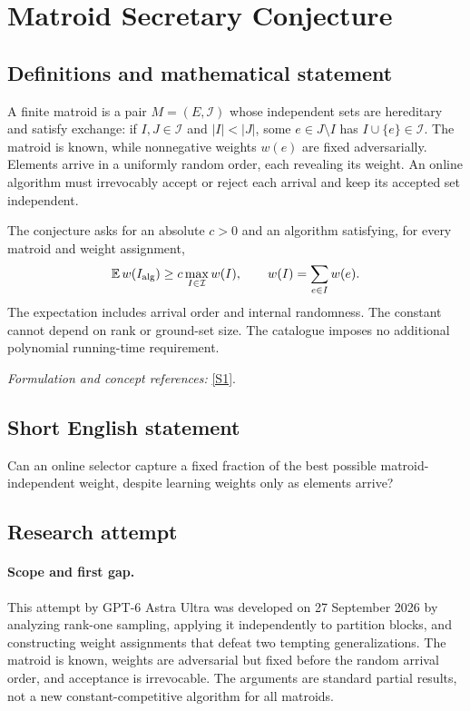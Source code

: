 \documentclass[11pt]{article}
\begin{document}
\section*{\texorpdfstring{Matroid Secretary Conjecture}{Matroid Secretary Conjecture}}\label{30006930}
\subsection{Definitions and mathematical statement}
A finite matroid is a pair $M=(E,\mathcal I)$ whose independent sets are hereditary and satisfy exchange: if $I,J\in\mathcal I$ and $|I|<|J|$, some $e\in J\setminus I$ has $I\cup\{e\}\in\mathcal I$. The matroid is known, while nonnegative weights $w(e)$ are fixed adversarially. Elements arrive in a uniformly random order, each revealing its weight. An online algorithm must irrevocably accept or reject each arrival and keep its accepted set independent.

The conjecture asks for an absolute $c>0$ and an algorithm satisfying, for every matroid and weight assignment,
\[
 {\mathbb{E}}\,w(I_{\rm alg})\ge c\max_{I\in\mathcal I}w(I),
 \qquad w(I)=\sum_{e\in I}w(e).
\]
The expectation includes arrival order and internal randomness. The constant cannot depend on rank or ground-set size. The catalogue imposes no additional polynomial running-time requirement.
\par\smallskip\textit{Formulation and concept references:} \href{https://drops.dagstuhl.de/storage/00lipics/lipics-vol215-itcs2022/LIPIcs.ITCS.2022.58/LIPIcs.ITCS.2022.58.pdf}{[S1]}.

\subsection{Short English statement}
Can an online selector capture a fixed fraction of the best possible matroid-independent weight, despite learning weights only as elements arrive?
\subsection{Research attempt}
\paragraph{Scope and first gap.}
This attempt by GPT-6 Astra Ultra was developed on 27 September 2026 by analyzing rank-one sampling, applying it independently to partition blocks, and constructing weight assignments that defeat two tempting generalizations. The matroid is known, weights are adversarial but fixed before the random arrival order, and acceptance is irrevocable. The arguments are standard partial results, not a new constant-competitive algorithm for all matroids.
\end{document}
